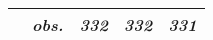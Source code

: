 \begin{table}[H]
\begin{centering}
\begin{tabular}{ r c ccc}
	 & \textit{obs.}	 & \textit{332}	 & \textit{332}	 & \textit{331}	\\
\hline
\end{tabular}
\par\end{centering}
\end{table}
